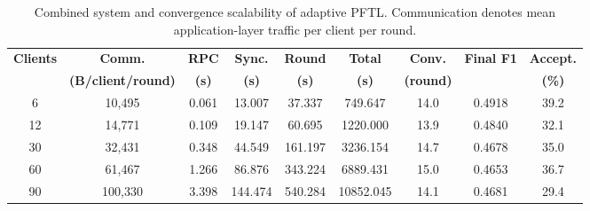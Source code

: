 \begin{table}[!t]
\centering
\small
\caption{Combined system and convergence scalability of adaptive PFTL. Communication denotes mean application-layer traffic per client per round.}
\label{tab:combined_scalability}
\setlength{\tabcolsep}{3pt}
\begin{tabular}{ccccccccc}
\toprule
\textbf{Clients}
& \textbf{Comm.}
& \textbf{RPC}
& \textbf{Sync.}
& \textbf{Round}
& \textbf{Total}
& \textbf{Conv.}
& \textbf{Final F1}
& \textbf{Accept.} \\

& \textbf{(B/client/round)}
& \textbf{(s)}
& \textbf{(s)}
& \textbf{(s)}
& \textbf{(s)}
& \textbf{(round)}
&
& \textbf{(\%)} \\
\midrule
6 & 10,495 & 0.061 & 13.007 & 37.337 & 749.647 & 14.0 & 0.4918 & 39.2 \\
12 & 14,771 & 0.109 & 19.147 & 60.695 & 1220.000 & 13.9 & 0.4840 & 32.1 \\
30 & 32,431 & 0.348 & 44.549 & 161.197 & 3236.154 & 14.7 & 0.4678 & 35.0 \\
60 & 61,467 & 1.266 & 86.876 & 343.224 & 6889.431 & 15.0 & 0.4653 & 36.7 \\
90 & 100,330 & 3.398 & 144.474 & 540.284 & 10852.045 & 14.1 & 0.4681 & 29.4 \\
\bottomrule
\end{tabular}
\end{table}
